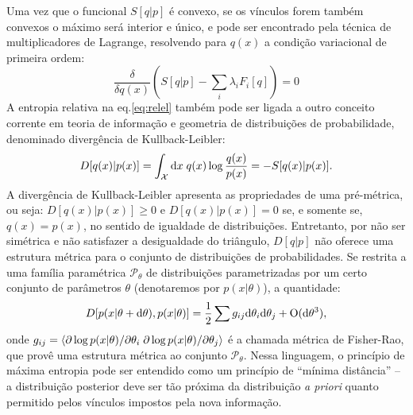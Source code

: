 Uma vez que o funcional $S[q | p]$ é convexo, se os vínculos forem também convexos o máximo será interior e único, e pode ser encontrado pela técnica de multiplicadores de Lagrange, resolvendo para $q(x)$ a condição variacional de primeira ordem:
\begin{equation}
\label{eq:entropymaximization}
\frac{\delta }{\delta q(x)}\left( S[q|p] - \sum_{i} \lambda_i F_i[q]\right) = 0
\end{equation}
A entropia relativa na eq.\eqref{eq:relel} também pode ser ligada a outro conceito corrente em teoria de informação e geometria de distribuições de probabilidade, denominado divergência de Kullback-Leibler\cite{Amari2000}:
\begin{equation}
\label{eq:kldiv}
 D[q(x) | p(x)] = \int_{\mathcal{X}} \ud x\; q(x) \log\frac{q(x)}{p(x)} = - S[q(x) | p(x)].
\end{equation}
A divergência de Kullback-Leibler apresenta as propriedades de uma pré-métrica, ou seja:  $D[q(x) | p(x)]\ge 0$ e $ D[q(x) | p(x)] = 0$ se, e somente se, $q(x) = p(x)$, no sentido de igualdade de distribuições. Entretanto, por não ser simétrica e não satisfazer a desigualdade do triângulo, $D[q|p]$ não oferece uma estrutura métrica para o conjunto de distribuições de probabilidades. Se restrita a uma família paramétrica  $\mathcal{P}_\theta$ de distribuições parametrizadas por um certo conjunto de parâmetros $\theta$ (denotaremos por $p(x|\theta)$), a quantidade:
\begin{equation}
 D[p(x|\theta+\mathrm{d}\theta), p(x|\theta)] = \frac{1}{2}\sum g_{ij} \mathrm{d}\theta_i \mathrm{d}\theta_j + \mathrm{O}(\mathrm{d}\theta^3),
\end{equation}
onde $g_{ij} = \left\langle \partial \log p(x|\theta)/ \partial \theta_i\;{\partial \log p(x|\theta) / \partial \theta_j} \right\rangle$ é a chamada métrica de Fisher-Rao, que provê uma estrutura métrica\cite{Amari2000} ao conjunto $\mathcal{P}_\theta$. Nessa linguagem, o princípio de máxima entropia pode ser entendido como um princípio de ``mínima distância'' -- a distribuição posterior deve ser tão próxima da distribuição \emph{a priori} quanto permitido pelos vínculos impostos pela nova informação.
